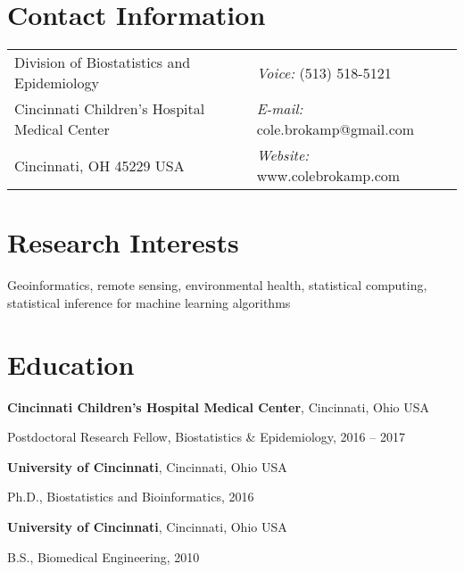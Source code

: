 \documentclass[margin,line]{res}
\newenvironment{list1}{
  \begin{list}{\ding{113}}{%
      \setlength{\itemsep}{0in}
      \setlength{\parsep}{0in} \setlength{\parskip}{0in}
      \setlength{\topsep}{0in} \setlength{\partopsep}{0in}
      \setlength{\leftmargin}{0.17in}}}{\end{list}}
\begin{document}

\begin{resume}
\section{\sc Contact Information}
\vspace{.05in}
\begin{tabular}{@{}p{3in}p{4in}}
Division of Biostatistics and Epidemiology & {\it Voice:}  (513) 518-5121 \\
Cincinnati Children's Hospital Medical Center & {\it E-mail:}  cole.brokamp@gmail.com\\
Cincinnati, OH 45229 USA  & {\it Website:} www.colebrokamp.com \\
\end{tabular}


\section{\sc Research Interests}
Geoinformatics, remote sensing, environmental health, statistical computing,
statistical inference for machine learning algorithms

\section{\sc Education}

{\bf Cincinnati Children's Hospital Medical Center}, Cincinnati, Ohio USA \\
\vspace*{-.1in}
\begin{list1}
\item[]Postdoctoral Research Fellow, Biostatistics \& Epidemiology, 2016 -- 2017
\end{list1}

{\bf University of Cincinnati}, Cincinnati, Ohio USA \\
\vspace*{-.1in}
\begin{list1}
\item[]Ph.D., Biostatistics and Bioinformatics, 2016
\end{list1}

{\bf University of Cincinnati}, Cincinnati, Ohio USA\\
\vspace*{-.1in}
\begin{list1}
\item[]B.S., Biomedical Engineering, 2010
\end{list1}



\end{resume}
\end{document}
